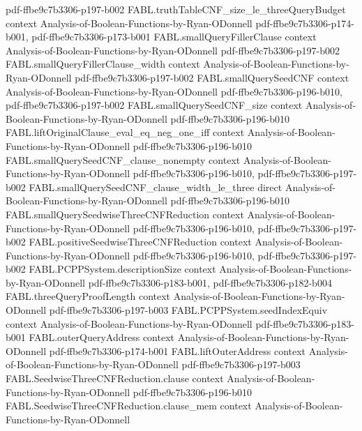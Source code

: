 \begin{theorem}
{    pdf-ffbe9c7b3306-p197-b002}
\proofstep
  {FABL.truthTableCNF_size_le_threeQueryBudget}
  {context}
  {Analysis-of-Boolean-Functions-by-Ryan-ODonnell}
  {pdf-ffbe9c7b3306-p174-b001,
    pdf-ffbe9c7b3306-p173-b001}
\proofstep
  {FABL.smallQueryFillerClause}
  {context}
  {Analysis-of-Boolean-Functions-by-Ryan-ODonnell}
  {pdf-ffbe9c7b3306-p197-b002}
\proofstep
  {FABL.smallQueryFillerClause_width}
  {context}
  {Analysis-of-Boolean-Functions-by-Ryan-ODonnell}
  {pdf-ffbe9c7b3306-p197-b002}
\proofstep
  {FABL.smallQuerySeedCNF}
  {context}
  {Analysis-of-Boolean-Functions-by-Ryan-ODonnell}
  {pdf-ffbe9c7b3306-p196-b010,
    pdf-ffbe9c7b3306-p197-b002}
\proofstep
  {FABL.smallQuerySeedCNF_size}
  {context}
  {Analysis-of-Boolean-Functions-by-Ryan-ODonnell}
  {pdf-ffbe9c7b3306-p196-b010}
\proofstep
  {FABL.liftOriginalClause_eval_eq_neg_one_iff}
  {context}
  {Analysis-of-Boolean-Functions-by-Ryan-ODonnell}
  {pdf-ffbe9c7b3306-p196-b010}
\proofstep
  {FABL.smallQuerySeedCNF_clause_nonempty}
  {context}
  {Analysis-of-Boolean-Functions-by-Ryan-ODonnell}
  {pdf-ffbe9c7b3306-p196-b010,
    pdf-ffbe9c7b3306-p197-b002}
\proofstep
  {FABL.smallQuerySeedCNF_clause_width_le_three}
  {direct}
  {Analysis-of-Boolean-Functions-by-Ryan-ODonnell}
  {pdf-ffbe9c7b3306-p196-b010}
\proofstep
  {FABL.smallQuerySeedwiseThreeCNFReduction}
  {context}
  {Analysis-of-Boolean-Functions-by-Ryan-ODonnell}
  {pdf-ffbe9c7b3306-p196-b010,
    pdf-ffbe9c7b3306-p197-b002}
\proofstep
  {FABL.positiveSeedwiseThreeCNFReduction}
  {context}
  {Analysis-of-Boolean-Functions-by-Ryan-ODonnell}
  {pdf-ffbe9c7b3306-p196-b010,
    pdf-ffbe9c7b3306-p197-b002}
\proofstep
  {FABL.PCPPSystem.descriptionSize}
  {context}
  {Analysis-of-Boolean-Functions-by-Ryan-ODonnell}
  {pdf-ffbe9c7b3306-p183-b001,
    pdf-ffbe9c7b3306-p182-b004}
\proofstep
  {FABL.threeQueryProofLength}
  {context}
  {Analysis-of-Boolean-Functions-by-Ryan-ODonnell}
  {pdf-ffbe9c7b3306-p197-b003}
\proofstep
  {FABL.PCPPSystem.seedIndexEquiv}
  {context}
  {Analysis-of-Boolean-Functions-by-Ryan-ODonnell}
  {pdf-ffbe9c7b3306-p183-b001}
\proofstep
  {FABL.outerQueryAddress}
  {context}
  {Analysis-of-Boolean-Functions-by-Ryan-ODonnell}
  {pdf-ffbe9c7b3306-p174-b001}
\proofstep
  {FABL.liftOuterAddress}
  {context}
  {Analysis-of-Boolean-Functions-by-Ryan-ODonnell}
  {pdf-ffbe9c7b3306-p197-b003}
\proofstep
  {FABL.SeedwiseThreeCNFReduction.clause}
  {context}
  {Analysis-of-Boolean-Functions-by-Ryan-ODonnell}
  {pdf-ffbe9c7b3306-p196-b010}
\proofstep
  {FABL.SeedwiseThreeCNFReduction.clause_mem}
  {context}
  {Analysis-of-Boolean-Functions-by-Ryan-ODonnell}

\end{theorem}
